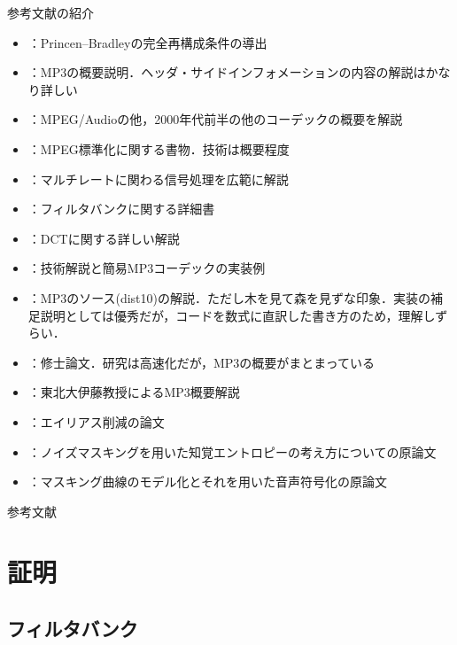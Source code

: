 \documentclass[14pt,xcolor=dvipsnames,table,dvipdfmx]{beamer}
\begin{document}
\begin{frame}{参考文献の紹介}
    \scriptsize
    \begin{itemize}
        \item \cite{princen1986analysis}：Princen--Bradleyの完全再構成条件の導出
        \item \cite{raissi2002theory}：MP3の概要説明．ヘッダ・サイドインフォメーションの内容の解説はかなり詳しい
        \item \cite{fujiwara2001}：MPEG/Audioの他，2000年代前半の他のコーデックの概要を解説
        \item \cite{yasuda1994}：MPEG標準化に関する書物．技術は概要程度
        \item \cite{kiya1995}：マルチレートに関わる信号処理を広範に解説
        \item \cite{vaidyanathan2002}：フィルタバンクに関する詳細書
        \item \cite{kiya1997}：DCTに関する詳しい解説
        \item \cite{kosugi200108,kosugi200109,kosugi200111,kosugi200201,kosugi200202}：技術解説と簡易MP3コーデックの実装例
        \item \cite{urata1999}：MP3のソース(dist10)の解説．ただし木を見て森を見ずな印象．実装の補足説明としては優秀だが，コードを数式に直訳した書き方のため，理解しずらい．
        \item \cite{li2002mpegaudiolayer3}：修士論文．研究は高速化だが，MP3の概要がまとまっている
        \item \cite{ito2015highefficiency}：東北大伊藤教授によるMP3概要解説
        \item \cite{edler1992aliasing,liu1997design}：エイリアス削減の論文
        \item \cite{johnston1988estimation}：ノイズマスキングを用いた知覚エントロピーの考え方についての原論文
        \item \cite{schroeder1979optimizing}：マスキング曲線のモデル化とそれを用いた音声符号化の原論文
    \end{itemize}
\end{frame}

\begin{frame}[allowframebreaks]{参考文献}
    \printbibliography[heading=none]
\end{frame}

\section{証明}

\subsection{フィルタバンク} \label{sec:proofs_filter_bank}
\end{document}
